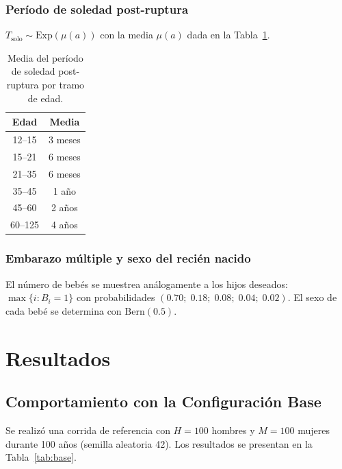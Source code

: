 \documentclass[12pt, a4paper]{article}
\newcommand{\Exp}[1]{\mathrm{Exp}\!\left(#1\right)}
\newcommand{\Bern}[1]{\mathrm{Bern}\!\left(#1\right)}
\begin{document}
\subsubsection*{Período de soledad post-ruptura}

$T_\mathrm{solo} \sim \Exp{\mu(a)}$ con la media $\mu(a)$ dada en la
Tabla~\ref{tab:soledad}.

\begin{table}[H]
  \centering
  \caption{Media del período de soledad post-ruptura por tramo de edad.}
  \label{tab:soledad}
  \begin{tabular}{@{}cc@{}}
    \toprule
    \textbf{Edad} & \textbf{Media} \\
    \midrule
    12--15   & 3 meses \\
    15--21   & 6 meses \\
    21--35   & 6 meses \\
    35--45   & 1 año \\
    45--60   & 2 años \\
    60--125  & 4 años \\
    \bottomrule
  \end{tabular}
\end{table}

\subsubsection*{Embarazo múltiple y sexo del recién nacido}

El número de bebés se muestrea análogamente a los hijos deseados:
$\max\{i : B_i = 1\}$ con probabilidades $(0.70;\; 0.18;\; 0.08;\; 0.04;\;
0.02)$. El sexo de cada bebé se determina con $\Bern{0.5}$.

\section{Resultados}

\subsection{Comportamiento con la Configuración Base}

Se realizó una corrida de referencia con $H = 100$ hombres y $M = 100$
mujeres durante 100 años (semilla aleatoria 42). Los resultados se
presentan en la Tabla~\ref{tab:base}.
\end{document}

